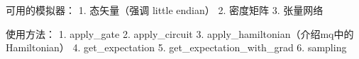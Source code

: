 可用的模拟器：
1. 态矢量（强调 little endian）
2. 密度矩阵
3. 张量网络

使用方法：
1. apply_gate
2. apply_circuit
3. apply_hamiltonian（介绍mq中的Hamiltonian）
4. get_expectation
5. get_expectation_with_grad
6. sampling